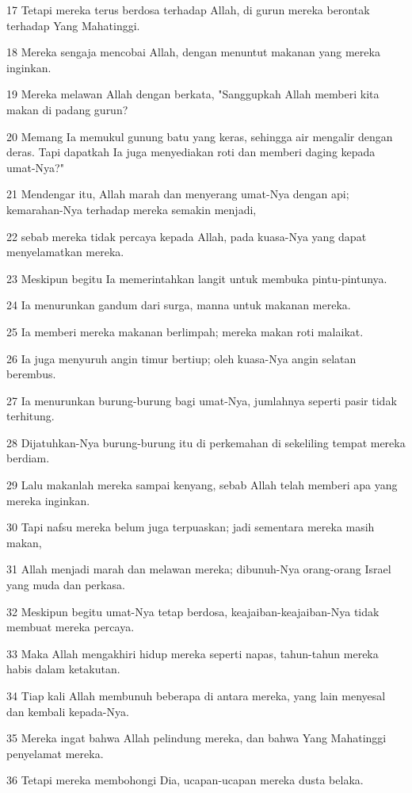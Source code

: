 \par 17 Tetapi mereka terus berdosa terhadap Allah, di gurun mereka berontak terhadap Yang Mahatinggi.
\par 18 Mereka sengaja mencobai Allah, dengan menuntut makanan yang mereka inginkan.
\par 19 Mereka melawan Allah dengan berkata, "Sanggupkah Allah memberi kita makan di padang gurun?
\par 20 Memang Ia memukul gunung batu yang keras, sehingga air mengalir dengan deras. Tapi dapatkah Ia juga menyediakan roti dan memberi daging kepada umat-Nya?"
\par 21 Mendengar itu, Allah marah dan menyerang umat-Nya dengan api; kemarahan-Nya terhadap mereka semakin menjadi,
\par 22 sebab mereka tidak percaya kepada Allah, pada kuasa-Nya yang dapat menyelamatkan mereka.
\par 23 Meskipun begitu Ia memerintahkan langit untuk membuka pintu-pintunya.
\par 24 Ia menurunkan gandum dari surga, manna untuk makanan mereka.
\par 25 Ia memberi mereka makanan berlimpah; mereka makan roti malaikat.
\par 26 Ia juga menyuruh angin timur bertiup; oleh kuasa-Nya angin selatan berembus.
\par 27 Ia menurunkan burung-burung bagi umat-Nya, jumlahnya seperti pasir tidak terhitung.
\par 28 Dijatuhkan-Nya burung-burung itu di perkemahan di sekeliling tempat mereka berdiam.
\par 29 Lalu makanlah mereka sampai kenyang, sebab Allah telah memberi apa yang mereka inginkan.
\par 30 Tapi nafsu mereka belum juga terpuaskan; jadi sementara mereka masih makan,
\par 31 Allah menjadi marah dan melawan mereka; dibunuh-Nya orang-orang Israel yang muda dan perkasa.
\par 32 Meskipun begitu umat-Nya tetap berdosa, keajaiban-keajaiban-Nya tidak membuat mereka percaya.
\par 33 Maka Allah mengakhiri hidup mereka seperti napas, tahun-tahun mereka habis dalam ketakutan.
\par 34 Tiap kali Allah membunuh beberapa di antara mereka, yang lain menyesal dan kembali kepada-Nya.
\par 35 Mereka ingat bahwa Allah pelindung mereka, dan bahwa Yang Mahatinggi penyelamat mereka.
\par 36 Tetapi mereka membohongi Dia, ucapan-ucapan mereka dusta belaka.

